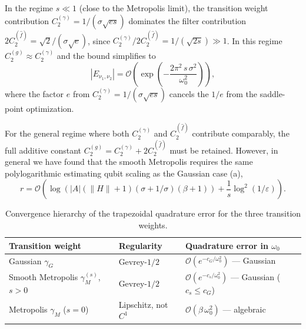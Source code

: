 \begin{enumerate}[(a)]
    In the regime $s \ll 1$ (close to the Metropolis limit), the transition weight contribution $C_2^{(\gamma)} = 1/(\sigma\sqrt{es})$ dominates the filter contribution $2C_2^{(\hat{f})} = \sqrt{2}/(\sigma\sqrt{e})$, since $C_2^{(\gamma)}/2C_2^{(\hat{f})} = 1/(\sqrt{2s}) \gg 1$. In this regime $C_2^{(g)} \approx C_2^{(\gamma)}$ and the bound simplifies to
    \begin{equation}\label{eq:smooth-metro-dominant-regime}
        |E_{\nu_1,\nu_2}| = \mathcal{O}\!\left(\exp\!\left(-\frac{2\pi^2\,s\,\sigma^2}{\omega_0^2}\right)\right),
    \end{equation}
    where the factor $e$ from $C_2^{(\gamma)} = 1/(\sigma\sqrt{es})$ cancels the $1/e$ from the saddle-point optimization. 

    For the general regime where both $C_2^{(\gamma)}$ and $C_2^{(\hat{f})}$ contribute comparably, the full additive constant $C_2^{(g)} = C_2^{(\gamma)} + 2C_2^{(\hat{f})}$ must be retained. However, in general we have found that the smooth Metropolis requires the same polylogarithmic estimating qubit scaling as the Gaussian case (a), 
    \begin{equation}
        r = \mathcal{O}\!\left(\log\!\left(|A|(\|H\|{+}1)(\sigma{+}1/\sigma)(\beta{+}1)\right) + \frac{1}{s}\log^2(1/\varepsilon)\right).
    \end{equation}

    \begin{table}[ht]
    \centering
    \begin{tabular}{lll}
    \toprule
    Transition weight & Regularity & Quadrature error in $\omega_0$ \\
    \midrule
    Gaussian $\gamma_G$ & Gevrey-$1/2$ & $\mathcal{O}(e^{-c_G/\omega_0^2})$ — Gaussian \\
    Smooth Metropolis $\gamma_M^{(s)}$, $s > 0$ & Gevrey-$1/2$ & $\mathcal{O}(e^{-c_s/\omega_0^2})$ — Gaussian ($c_s \leq c_G$) \\
    Metropolis $\gamma_M$ ($s = 0$) & Lipschitz, not $C^1$ & $\mathcal{O}(\beta\,\omega_0^2)$ — algebraic \\
    \bottomrule
    \end{tabular}
    \caption{Convergence hierarchy of the trapezoidal quadrature error for the three transition weights.}
    \label{tab:quadrature-hierarchy}
    \end{table}
\end{enumerate}

